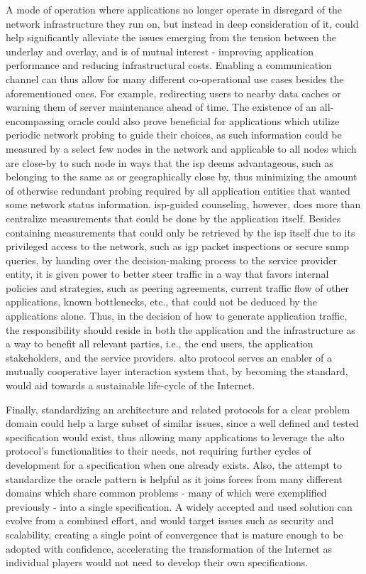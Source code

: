     A mode of operation where applications no longer operate in disregard of the network infrastructure they run on, but instead in deep consideration of it, could help significantly alleviate the issues emerging from the tension between the underlay and overlay, and is of mutual interest - improving application performance and reducing infrastructural costs.
    Enabling a communication channel can thus allow for many different co-operational use cases besides the aforementioned ones.
    For example, redirecting users to nearby data caches or warning them of server maintenance ahead of time.
    The existence of an all-encompassing oracle could also prove beneficial for applications which utilize periodic network probing to guide their choices, as such information could be measured by a select few nodes in the network and applicable to all nodes which are close-by to such node in ways that the \gls{isp} deems advantageous, such as belonging to the same \gls{as} or geographically close by, thus minimizing the amount of otherwise redundant probing required by all application entities that wanted some network status information.
    \gls{isp}-guided counseling, however, does more than centralize measurements that could be done by the application itself.
    Besides containing measurements that could only be retrieved by the \gls{isp} itself due to its privileged access to the network, such as \gls{igp} packet inspections or secure \gls{snmp} queries, by handing over the decision-making process to the service provider entity, it is given power to better steer traffic in a way that favors internal policies and strategies, such as peering agreements, current traffic flow of other applications, known bottlenecks, etc., that could not be deduced by the applications alone.
    Thus, in the decision of how to generate application traffic, the responsibility should reside in both the application and the infrastructure as a way to benefit all relevant parties, i.e., the end users, the application stakeholders, and the service providers.
    \gls{alto} protocol serves an enabler of a mutually cooperative layer interaction system that, by becoming the standard, would aid towards a sustainable life-cycle of the Internet.

    Finally, standardizing an architecture and related protocols for a clear problem domain could help a large subset of similar issues, since a well defined and tested specification would exist, thus allowing many applications to leverage the \gls{alto} protocol's functionalities to their needs, not requiring further cycles of development for a specification when one already exists.
    Also, the attempt to standardize the oracle pattern is helpful as it joins forces from many different domains which share common problems - many of which were exemplified previously - into a single specification.
    A widely accepted and used solution can evolve from a combined effort, and would target issues such as security and scalability, creating a single point of convergence that is mature enough to be adopted with confidence, accelerating the transformation of the Internet as individual players would not need to develop their own specifications.

